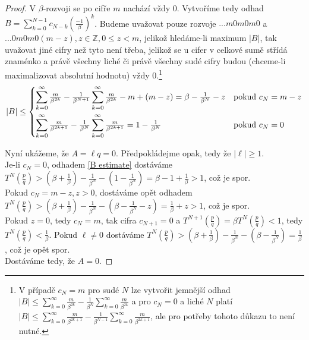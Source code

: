 \documentclass{article}
\theoremstyle{definition}
\theoremstyle{definition}
\theoremstyle{remark}
\numberwithin{equation}{section}
\begin{document}
\begin{proof}
	V $\beta$-rozvoji se po cifře $m$ nachází vždy 0. Vytvoříme tedy odhad $B = \sum^{N - 1}_{k = 0}c_{N - k}(\tfrac{-1}{\beta})^k$. Budeme uvažovat pouze rozvoje $...m0m0m0$ a $...0m0m0(m - z), z \in \mathbb{Z}, 0 \leq z < m$, jelikož hledáme-li maximum $|B|$, tak uvažovat jiné cifry než tyto není třeba, jelikož se u cifer v celkové sumě střídá znaménko a právě všechny liché či právě všechny sudé cifry budou (chceme-li maximalizovat absolutní hodnotu) vždy 0.\footnote{V případě $c_N = m$ pro sudé $N$ lze vytvořit jemnější odhad $|B| \leq \sum^\infty_{k = 0}\tfrac{m}{\beta^{2k}} - \frac{1}{\beta^{N}}\sum^\infty_{k = 0}\tfrac{m}{\beta^{2k}}$ a pro $c_N = 0$ a liché $N$ platí $|B| \leq \sum^\infty_{k = 0}\tfrac{m}{\beta^{2k + 1}} - \frac{1}{\beta^{N - 1}}\sum^\infty_{k = 0}\tfrac{m}{\beta^{2k + 1}}$, ale pro potřeby tohoto důkazu to není nutné.}
	\begin{equation*}
		|B| \leq
		\begin{dcases}
			\sum^\infty_{k = 0}\tfrac{m}{\beta^{2k}} - \tfrac{1}{\beta^{N + 1}}\sum^\infty_{k = 0}\tfrac{m}{\beta^{2k}} - m + (m - z)= \beta - \tfrac{1}{\beta^{N}} - z & \textrm{pokud}\ c_N = m - z \\
			\sum^\infty_{k = 0}\tfrac{m}{\beta^{2k + 1}} - \tfrac{1}{\beta^{N}}\sum^\infty_{k = 0}\tfrac{m}{\beta^{2k + 1}} = 1 - \tfrac{1}{\beta^{N}}                  & \textrm{pokud}\ c_N = 0
		\end{dcases}
	\end{equation*}

	Nyní ukážeme, že $A = \ell q = 0$. Předpokládejme opak, tedy že $|\ell| \geq 1$.\\
	Je-li $c_N = 0$, odhadem \eqref{B estimate} dostáváme $T^N(\frac{p}{q}) > (\beta + \tfrac{1}{\beta}) - \tfrac{1}{\beta^N} - (1 - \frac{1}{\beta^{N}}) = \beta - 1 + \tfrac{1}{\beta} > 1$, což je spor.\\
	Pokud $c_N = m - z, z > 0$, dostáváme opět odhadem $T^N(\frac{p}{q}) > (\beta + \tfrac{1}{\beta}) - \tfrac{1}{\beta^N} - (\beta - \frac{1}{\beta^{N}} - z) = \tfrac{1}{\beta} + z > 1$, což je spor.\\
	Pokud $z = 0$, tedy $c_N = m$, tak cifra $c_{N + 1} = 0$ a $T^{N + 1}(\frac{p}{q}) = \beta T^N(\frac{p}{q}) < 1$, tedy $T^N(\frac{p}{q}) < \frac{1}{\beta}$. Pokud $\ell \neq 0$ dostáváme $T^N(\frac{p}{q}) > (\beta + \tfrac{1}{\beta}) - \tfrac{1}{\beta^N} - (\beta - \frac{1}{\beta^{N}}) = \tfrac{1}{\beta}$, což je opět spor.\\
	Dostáváme tedy, že $A = 0$.


\end{proof}
\end{document}
